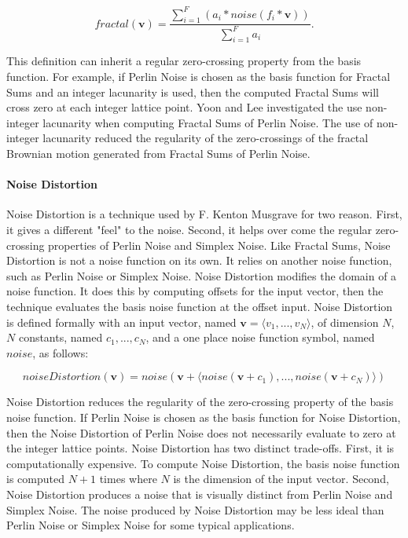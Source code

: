\documentclass[12pt]{article}
\theoremstyle{definition}
\theoremstyle{remark}
\begin{document}
\begin{equation*}
fractal(\textbf{v}) = \frac{\sum_{i=1}^{F}(a_i * noise(f_i * \textbf{v}))}{\sum_{i=1}^{F}a_i}.
\end{equation*}

This definition can inherit a regular zero-crossing property from the basis function. For example, if Perlin Noise is chosen as the basis function for Fractal Sums and an integer lacunarity is used, then the computed Fractal Sums will cross zero at each integer lattice point. Yoon and Lee\cite{yoonlee2008} investigated the use non-integer lacunarity when computing Fractal Sums of Perlin Noise. The use of non-integer lacunarity reduced the regularity of the zero-crossings of the fractal Brownian motion generated from Fractal Sums of Perlin Noise.

\paragraph{Noise Distortion}

Noise Distortion is a technique used by F. Kenton Musgrave\cite{musgraveetal1989} for two reason. First, it gives a different "feel" to the noise. Second, it helps over come the regular zero-crossing properties of Perlin Noise and Simplex Noise. Like Fractal Sums, Noise Distortion is not a noise function on its own. It relies on another noise function, such as Perlin Noise or Simplex Noise. Noise Distortion modifies the domain of a noise function. It does this by computing offsets for the input vector, then the technique evaluates the basis noise function at the offset input. Noise Distortion is defined formally with an input vector, named $\textbf{v}=\langle v_1, ..., v_N\rangle$, of dimension $N$, $N$ constants, named $c_1, ..., c_N$, and a one place noise function symbol, named $noise$, as follows:

\begin{equation*}
	noiseDistortion(\textbf{v})=noise(\textbf{v} + \langle noise(\textbf{v}+c_1), ..., noise(\textbf{v}+c_N) \rangle)
\end{equation*}

Noise Distortion reduces the regularity of the zero-crossing property of the basis noise function. If Perlin Noise is chosen as the basis function for Noise Distortion, then the Noise Distortion of Perlin Noise does not necessarily evaluate to zero at the integer lattice points. Noise Distortion has two distinct trade-offs. First, it is computationally expensive. To compute Noise Distortion, the basis noise function is computed $N+1$ times where $N$ is the dimension of the input vector. Second, Noise Distortion produces a noise that is visually distinct from Perlin Noise and Simplex Noise. The noise produced by Noise Distortion may be less ideal than Perlin Noise or Simplex Noise for some typical applications.
\end{document}
